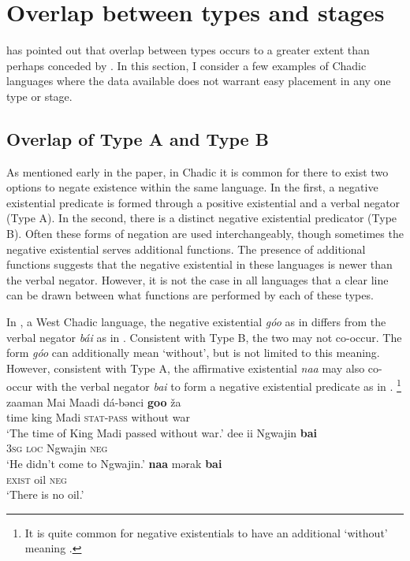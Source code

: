 \documentclass[output=paper]{langsci/langscibook}
\begin{document}
\section{Overlap between types and stages}\label{sec:3:4}

\citet{Veselinova2016} has pointed out that overlap between types occurs to a greater extent than perhaps conceded by \citet{Croft1991}. In this section, I consider a few examples of Chadic languages where the data available does not warrant easy placement in any one type or stage. 

\subsection{Overlap of Type A and Type B}\label{sec:3:4.1}

As mentioned early in the paper, in Chadic it is common for there to exist two options to negate existence within the same language. In the first, a negative existential predicate is formed through a positive existential and a verbal negator (Type A). In the second, there is a distinct negative existential predicator (Type B). Often these forms of negation are used interchangeably, though sometimes the negative existential serves additional functions. The presence of additional functions suggests that the negative existential in these languages is newer than the verbal negator. However, it is not the case in all languages that a clear line can be drawn between what functions are performed by each of these types. 

In , a West Chadic language, the negative existential
\textit{g\'oo} as in  differs from the verbal negator
\textit{b\'ai} as in . Consistent with Type B, the
two may not co-occur. The form \textit{g\'oo} can additionally mean
`without', but is not limited to this meaning. However, consistent with
Type A, the affirmative existential \textit{naa} may also co-occur with the
verbal negator \textit{bai} to form a negative existential predicate as in
.%
\footnote{It is quite common for negative existentials
to have an additional `without' meaning \citep{Veselinova2013}.}
\ea\label{ex:ngizim-king-Ngwajin-oil}
\\ 
\ea\label{ex:ngizim-king}
\gll zaaman Mai Maadi d\'a-bənci \textbf{goo} \v za\\ 
time king Madi \textsc{stat-pass} without war\\ 
\glt `The time of King Madi passed without war.'%
%
\footnotemark{} 
%
\ex\label{ex:ngizim-Ngwajin} 
\gll dee ii Ngwajin \textbf{bai}\\ 3\textsc{sg} \textsc{loc} Ngwajin \textsc{neg}\\ 
\glt `He didn't come to Ngwajin.'
\ex\label{ex:ngizim-oil}
\gll \textbf{naa} mərak \textbf{bai}\\
\textsc{exist} oil \textsc{neg}\\
\glt `There is no oil.'
\z\z
\end{document}
